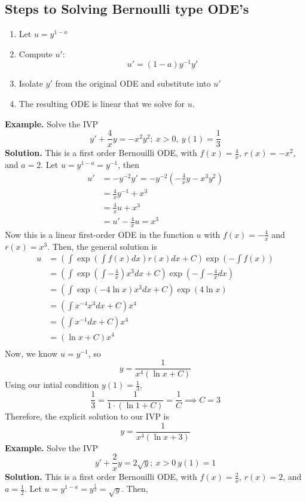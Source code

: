 \documentclass[openany]{report}
\begin{document}
\subsection{Steps to Solving Bernoulli type ODE's}
\begin{enumerate}
    \item Let $u = y^{1-a}$
    \item Compute $u'$:
    \[u' = (1-a)y^{-1}y'\]
    \item Isolate $y'$ from the original ODE and substitute into $u'$
    \item The resulting ODE is linear that we solve for $u$.  
\end{enumerate}
\textbf{Example.} Solve the IVP
\[y' + \frac{4}{x}y = -x^2y^2; \ x > 0, \ y(1) = \frac{1}{3}\]
\textbf{Solution.} This is a first order Bernouilli ODE, with $f(x) = \frac{4}{x}$, $r(x)  = -x^2$, and $a = 2$. Let $u = y^{1 - a} = y^{-1}$, then 
\begin{align*}
    u' &= -y^{-2}y' = -y^{-2}\left(-\frac{4}{x}y - x^3y^2\right)\\
    &= \frac{4}{x}y^{-1} + x^3\\
    &= \frac{4}{x}u + x^3\\
    &= u' - \frac{4}{x}u = x^3
\end{align*}
Now this is a linear first-order ODE in the function $u$ with $f(x) = -\frac{4}{x}$ and $r(x) = x^3$. Then, the general solution is
\begin{align*}
    u &= \left(\int \exp\left(\int f(x)dx\right)r(x)dx + C\right)\exp\left(-\int f(x) \right)\\
    &= \left(\int \exp\left(\int -\frac{4}{x}\right)x^3dx + C\right)\exp\left(-\int -\frac{4}{x}dx\right)\\
    &= \left(\int \exp(-4\ln x)x^3 dx+ C \right)\exp(4\ln x)\\
    &= \left(\int x^{-4}x^3dx + C\right)x^4\\
    &= \left(\int x^{-1}dx + C\right)x^4\\
    &= \left(\ln x + C\right)x^4\\
\end{align*}
Now, we know $u = y^{-1}$, so
\[y = \frac{1}{x^4(\ln x + C)}\]
Using our intial condition $y(1) = \frac{1}{3}$, 
\[\frac{1}{3} = \frac{1}{1 \cdot (\ln 1 + C)} = \frac{1}{C} \implies C = 3\]
Therefore, the explicit solution to our IVP is 
\[y = \frac{1}{x^4(\ln x + 3)}\]
\textbf{Example.} Solve the IVP
\[y' + \frac{2}{x}y = 2 \sqrt{y}; \ x > 0 \ y(1) = 1\]
\textbf{Solution.} This is a first order Bernouilli ODE, with $f(x) = \frac{2}{x}$, $r(x) = 2$, and $a = \frac{1}{2}$. Let $u = y^{1 - a} = y^{\frac{1}{2}} = \sqrt{y}$. Then, 
\end{document}
